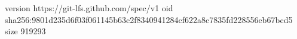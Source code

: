 version https://git-lfs.github.com/spec/v1
oid sha256:9801d235d6f03f061145b63c2f8340941284cf622a8c7835fd228556eb67bcd5
size 919293
